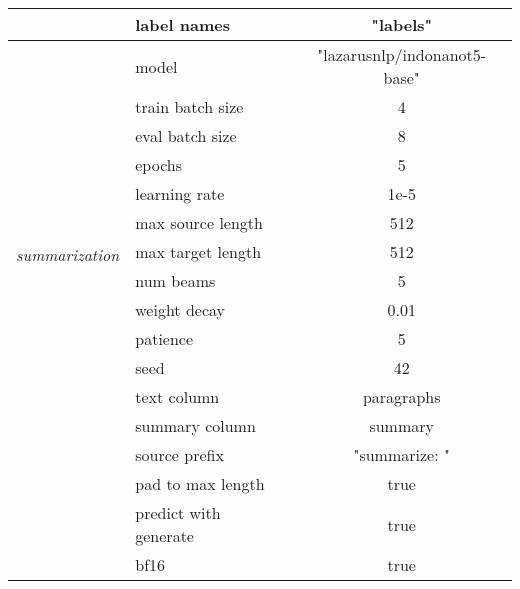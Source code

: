 \begin{table}[h]
\begin{tabular}{|c|l|c|}
                                                     & label names & "labels" \\ \hline
        \multirow{14}{*}{\textit{summarization}} & model & "lazarusnlp/indonanot5-base" \\ \cline{2-3}
                                                & train batch size & 4 \\ \cline{2-3}
                                                & eval batch size & 8 \\ \cline{2-3}
                                                & epochs & 5 \\ \cline{2-3}
                                                & learning rate & 1e-5 \\ \cline{2-3}
                                                & max source length & 512 \\ \cline{2-3}
                                                & max target length & 512 \\ \cline{2-3}
                                                & num beams & 5 \\ \cline{2-3}
                                                & weight decay & 0.01 \\ \cline{2-3}
                                                & patience & 5 \\ \cline{2-3}
                                                & seed & 42 \\ \cline{2-3}
                                                & text column & paragraphs \\ \cline{2-3}
                                                & summary column & summary \\ \cline{2-3}
                                                & source prefix & "summarize: " \\ \cline{2-3}
                                                & pad to max length & true \\ \cline{2-3}
                                                & predict with generate & true \\ \cline{2-3}
                                                & bf16 & true \\ \hline
    \end{tabular}
\end{table}
